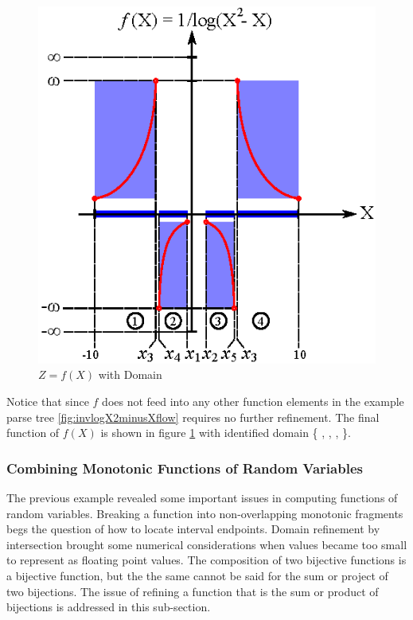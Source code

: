 \begin{figure}
  \centering
  \includegraphics{Images/invlogX2minusX.eps}
  \caption[$Z = f(X)$ with Domain]
          {$Z = f(X)$ with Domain}
  \label{fig:invlogX2minusX}
\end{figure}

Notice that since $f$ does not feed into any other function elements in the example parse tree \ref{fig:invlogX2minusXflow} requires no further refinement. The final function of $f(X)$ is shown in figure \ref{fig:invlogX2minusX} with identified domain \{ , , ,  \}. 

\subsubsection{Combining Monotonic Functions of Random Variables}

The previous example revealed some important issues in computing functions of random variables. Breaking a function into non-overlapping monotonic fragments begs the question of how to locate interval endpoints. Domain refinement by intersection brought some numerical considerations when values became too small to represent as floating point values. The composition of two bijective functions is a bijective function, but the the same cannot be said for the sum or project of two bijections. The issue of refining a function that is the sum or product of bijections is addressed in this sub-section.

